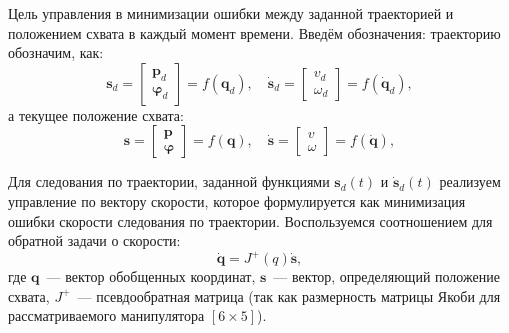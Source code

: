 Цель управления в минимизации ошибки между заданной траекторией и положением схвата в каждый момент времени. Введём обозначения: траекторию обозначим, как:
\begin{equation}
	\bm{s}_d = 
	\begin{bmatrix}
		\bm p_d \\
		\bm\varphi_d
	\end{bmatrix}
	= f(\bm{q}_d),
	\quad
	\dot{\bm{s}}_d = 
	\begin{bmatrix}
		v_d \\
		\omega_d
	\end{bmatrix}
	 = f(\dot{\bm{q}}_d),
\end{equation}
а текущее положение схвата:
\begin{equation}
	\bm{s} = 
	\begin{bmatrix}
		\bm p \\
		\bm\varphi
	\end{bmatrix}
	= f(\bm{q}),
	\quad
	\dot{\bm{s}} = 
	\begin{bmatrix}
		v \\
		\omega
	\end{bmatrix}
	= f(\dot{\bm{q}}),
\end{equation}



Для следования по траектории, заданной функциями $ \bm{s}_d(t) $ и  $ \dot{\bm{s}}_d(t) $ реализуем управление по вектору скорости, которое формулируется как минимизация ошибки скорости следования по траектории. Воспользуемся соотношением для обратной задачи о скорости:
\begin{equation}
	\dot{\bm{q}} = J^+(q) \dot{\bm{s}},
\end{equation}
где $ \bm{q} $~--- вектор обобщенных координат, $ \bm{s} $~--- вектор, определяющий положение схвата, $ J^+ $~--- псевдообратная матрица (так как размерность матрицы Якоби для рассматриваемого манипулятора $[6\times 5]$).

